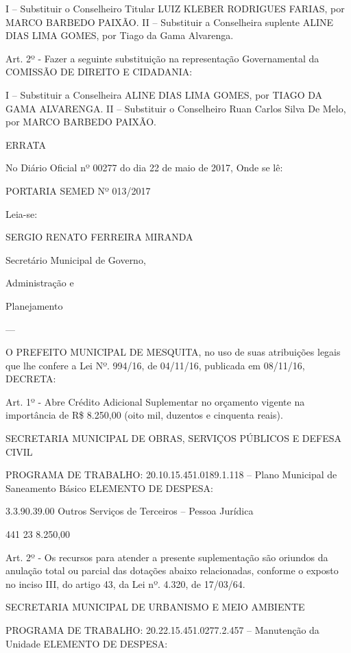 \documentclass{doliberto}
\begin{document}
I – Substituir o Conselheiro Titular LUIZ KLEBER 
RODRIGUES FARIAS, por MARCO BARBEDO PAIXÃO.  
II – Substituir a Conselheira suplente ALINE DIAS LIMA 
GOMES, por Tiago da Gama Alvarenga. 
 
Art. 2º - Fazer a seguinte substituição na representação 
Governamental da COMISSÃO DE DIREITO E CIDADANIA: 
 
I – Substituir a Conselheira ALINE DIAS LIMA GOMES, por 
TIAGO DA GAMA ALVARENGA. 
II – Substituir o Conselheiro Ruan Carlos Silva De Melo, 
por MARCO BARBEDO PAIXÃO. 

 

ERRATA  
 
No Diário Oficial nº 00277 do dia 22 de maio de 2017, 
Onde se lê: 

PORTARIA SEMED Nº 013/2017 

Leia-se: 

 

SERGIO RENATO FERREIRA MIRANDA 

Secretário Municipal de Governo, 

Administração e 

Planejamento 

---

O  PREFEITO  MUNICIPAL  DE  MESQUITA,  no  uso  de  suas 
atribuições  legais  que  lhe  confere  a  Lei  Nº.  994/16,  de 
04/11/16, publicada em 08/11/16, DECRETA: 
 
Art. 1º - Abre Crédito Adicional Suplementar no orçamento 
vigente na importância de R\$ 8.250,00 (oito mil, duzentos e 
cinquenta reais). 
 
SECRETARIA MUNICIPAL DE OBRAS, SERVIÇOS PÚBLICOS E 
DEFESA CIVIL 
 
PROGRAMA DE TRABALHO: 
20.10.15.451.0189.1.118 – Plano Municipal de Saneamento 
Básico 
ELEMENTO DE DESPESA: 

3.3.90.39.00  Outros  Serviços  de 
Terceiros  –  Pessoa 
Jurídica 

441  23  8.250,00 

 
 
 
Art. 2º - Os recursos para atender a presente suplementação 
são  oriundos  da  anulação  total  ou  parcial  das  dotações 
abaixo  relacionadas,  conforme  o  exposto  no  inciso  III,  do 
artigo 43, da Lei nº. 4.320, de 17/03/64. 
 
 
SECRETARIA  MUNICIPAL  DE  URBANISMO  E  MEIO 
AMBIENTE 
 
PROGRAMA DE TRABALHO: 
20.22.15.451.0277.2.457 – Manutenção da Unidade 
ELEMENTO DE DESPESA: 
\end{document}
